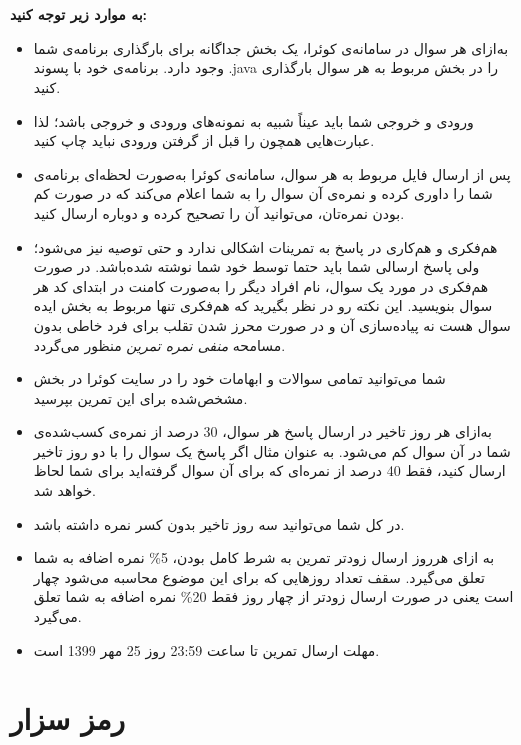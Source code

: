 \documentclass[]{article}
\begin{document}
 \Large \textbf{\\\\
به موارد زیر توجه کنید:}

\begin{itemize}[label=$\ast$]
\item به‌ازای هر سوال در سامانه‌ی کوئرا، یک بخش جداگانه برای بارگذاری برنامه‌ی شما وجود دارد. برنامه‌ی خود با پسوند .java را در بخش مربوط به هر سوال بارگذاری کنید.
\item ورودی و خروجی شما باید عیناً شبیه به نمونه‌های ورودی و خروجی باشد؛ لذا عبارت‌هایی همچون  را قبل از گرفتن ورودی نباید چاپ کنید.
\item پس از ارسال فایل مربوط به هر سوال، سامانه‌ی کوئرا به‌صورت لحظه‌ای برنامه‌ی شما را داوری کرده و نمره‌ی آن سوال را به شما اعلام می‌کند که در صورت کم بودن نمره‌تان، می‌توانید آن را تصحیح کرده و دوباره ارسال کنید.
\item هم‌فکری و هم‌کاری در پاسخ به تمرینات اشکالی ندارد و حتی توصیه نیز می‌شود؛ ولی پاسخ ارسالی شما باید حتما توسط خود شما نوشته شده‌باشد. در صورت هم‌فکری در مورد یک سوال، نام افراد دیگر را به‌صورت کامنت در ابتدای کد هر سوال بنویسید.  این نکته رو در نظر بگیرید که هم‌فکری تنها مربوط به بخش ایده سوال هست نه پیاده‌سازی آن و در صورت محرز شدن تقلب برای فرد خاطی بدون مسامحه \emph{ منفی نمره تمرین}
منظور می‌گردد. 
\item شما می‌توانید تمامی سوالات و ابهامات خود را در سایت کوئرا در بخش مشخص‌شده برای این تمرین بپرسید.
\item به‌ازای هر روز تاخیر در ارسال پاسخ هر سوال، 30 درصد از نمره‌ی کسب‌شده‌ی شما در آن سوال کم می‌شود. به عنوان مثال اگر پاسخ یک سوال را با دو روز تاخیر ارسال کنید، فقط 40 درصد از نمره‌ای که برای آن سوال گرفته‌اید برای شما لحاظ خواهد شد.
\item در کل شما می‌توانید سه روز تاخیر بدون کسر نمره داشته باشد.
\item به ازای هر‌روز ارسال زود‌تر تمرین به شرط کامل بودن، 5\% نمره اضافه به شما تعلق می‌گیرد. سقف تعداد روز‌هایی که  برای این موضوع محاسبه می‌شود چهار است یعنی در صورت ارسال زود‌تر از چهار روز فقط 20\% نمره اضافه به شما تعلق می‌گیرد. 
\item مهلت ارسال تمرین تا ساعت 23:59 روز 25 مهر 1399 است.
\end{itemize}



\newpage
\section{رمز سزار}
\end{document}
